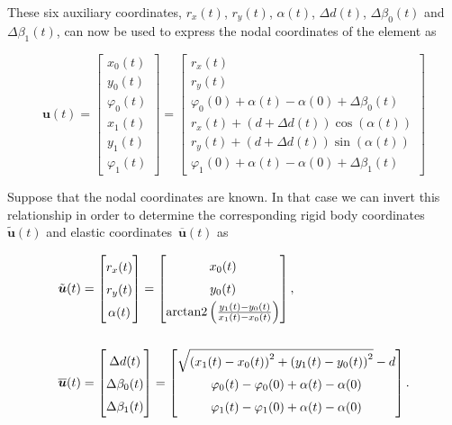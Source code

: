 These six auxiliary coordinates, $r_x(t)$, $r_y(t)$, $\alpha(t)$, $\Delta d(t)$, $\Delta\beta_0(t)$ and $\Delta\beta_1(t)$, can now be used to express the nodal coordinates of the element as

\begin{equation}
\renewcommand\arraystretch{1.5}
\boldsymbol{u}(t) = \begin{bmatrix}
x_0(t) \\
y_0(t) \\
\varphi_0(t) \\
x_1(t) \\
y_1(t) \\
\varphi_1(t)
\end{bmatrix}
=
\begin{bmatrix}
r_x(t) \\
r_y(t) \\
\varphi_0(0) + \alpha(t) - \alpha(0) + \Delta\beta_0(t) \\
r_x(t) + (d + \Delta d(t))\cos(\alpha(t)) \\
r_y(t) + (d + \Delta d(t))\sin(\alpha(t)) \\
\varphi_1(0) + \alpha(t) - \alpha(0) + \Delta\beta_1(t)
\end{bmatrix}
\end{equation}

Suppose that the nodal coordinates are known.
In that case we can invert this relationship in order to determine the corresponding rigid body coordinates~$\tilde{\boldsymbol{u}}(t)$ and elastic coordinates~$\overline{\boldsymbol{u}}(t)$ as

\begin{align}
\renewcommand\arraystretch{1.5}
\tilde{\boldsymbol{u}}(t) &=
\begin{bmatrix}
r_x(t) \\
r_y(t) \\
\alpha(t)
\end{bmatrix}
=
\begin{bmatrix}
x_0(t) \\
y_0(t) \\
\mathrm{arctan2}\left(\frac{y_1(t) - y_0(t)}{x_1(t) - x_0(t)}\right)
\end{bmatrix}, \\
\notag \\
\renewcommand\arraystretch{1.5}
\overline{\boldsymbol{u}}(t) &=
\begin{bmatrix}
\Delta d(t) \\
\Delta \beta_0(t) \\
\Delta \beta_1(t)
\end{bmatrix}
=
\begin{bmatrix}
\sqrt{\left(x_1(t) - x_0(t)\right)^2 + \left(y_1(t) - y_0(t)\right)^2} - d \\
\varphi_0(t) - \varphi_0(0) + \alpha(t) - \alpha(0) \\
\varphi_1(t) - \varphi_1(0) + \alpha(t) - \alpha(0)
\end{bmatrix}.
\end{align}

